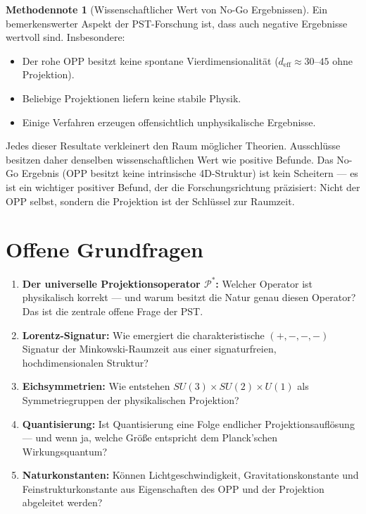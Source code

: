 \documentclass[11pt,a4paper]{article}
\theoremstyle{plain}
\theoremstyle{definition}
\newtheorem{methodennote}{Methodennote}[section]
\begin{document}
\begin{methodennote}[Wissenschaftlicher Wert von No-Go Ergebnissen]
Ein bemerkenswerter Aspekt der PST-Forschung ist, dass auch negative
Ergebnisse wertvoll sind. Insbesondere:

\begin{itemize}
  \item Der rohe OPP besitzt keine spontane Vierdimensionalit\"{a}t
        ($d_{\text{eff}} \approx 30$--$45$ ohne Projektion).
  \item Beliebige Projektionen liefern keine stabile Physik.
  \item Einige Verfahren erzeugen offensichtlich unphysikalische
        Ergebnisse.
\end{itemize}

Jedes dieser Resultate verkleinert den Raum m\"{o}glicher Theorien.
Ausschl\"{u}sse besitzen daher denselben wissenschaftlichen Wert wie
positive Befunde. Das No-Go Ergebnis (OPP besitzt keine intrinsische
4D-Struktur) ist kein Scheitern --- es ist ein wichtiger positiver
Befund, der die Forschungsrichtung pr\"{a}zisiert: Nicht der OPP selbst,
sondern die Projektion ist der Schl\"{u}ssel zur Raumzeit.
\end{methodennote}

\section{Offene Grundfragen}

\begin{enumerate}
  \item \textbf{Der universelle Projektionsoperator $\mathcal{P}^\ast$:}
        Welcher Operator ist physikalisch korrekt --- und warum besitzt
        die Natur genau diesen Operator? Das ist die zentrale offene Frage
        der PST.

  \item \textbf{Lorentz-Signatur:} Wie emergiert die charakteristische
        $(+,-,-,-)$ Signatur der Minkowski-Raumzeit aus einer
        signaturfreien, hochdimensionalen Struktur?

  \item \textbf{Eichsymmetrien:} Wie entstehen $SU(3) \times SU(2)
        \times U(1)$ als Symmetriegruppen der physikalischen Projektion?

  \item \textbf{Quantisierung:} Ist Quantisierung eine Folge endlicher
        Projektionsaufl\"{o}sung --- und wenn ja, welche Gr\"{o}\ss{}e
        entspricht dem Planck'schen Wirkungsquantum?

  \item \textbf{Naturkonstanten:} K\"{o}nnen Lichtgeschwindigkeit,
        Gravitationskonstante und Feinstrukturkonstante aus Eigenschaften
        des OPP und der Projektion abgeleitet werden?
\end{enumerate}
\end{document}
